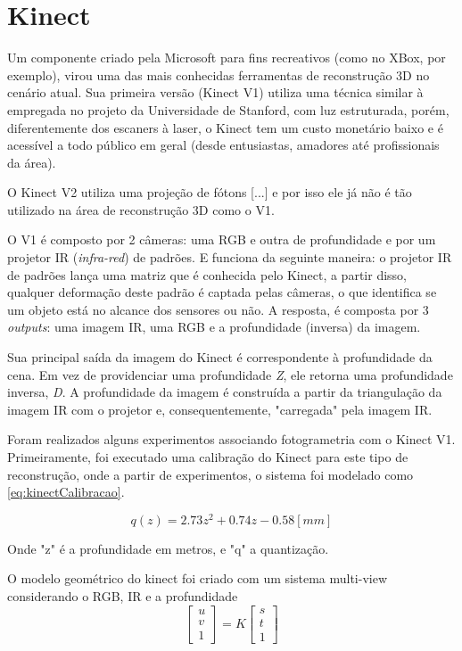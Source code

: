 \chapter{Kinect}\label{sec:kinect}
Um componente criado pela Microsoft para fins recreativos (como no XBox, por exemplo), virou uma das mais conhecidas ferramentas de reconstrução 3D no cenário atual. Sua primeira versão (Kinect V1) utiliza uma técnica similar à empregada no projeto da Universidade de Stanford, com luz estruturada, porém, diferentemente dos escaners à laser, o Kinect tem um custo monetário baixo e é acessível a todo público em geral (desde entusiastas, amadores até profissionais da área). 

O Kinect V2 utiliza uma projeção de fótons [...] e por isso ele já não é tão utilizado na área de reconstrução 3D como o V1. 

O V1 é composto por 2 câmeras: uma RGB e outra de profundidade e por um projetor IR ({\it infra-red}) de padrões. E funciona da seguinte maneira: o projetor IR de padrões lança uma matriz que é conhecida pelo Kinect, a partir disso, qualquer deformação deste padrão é captada pelas câmeras, o que identifica se um objeto está no alcance dos sensores ou não. A resposta, é composta por 3 {\it outputs}: uma imagem IR,  uma RGB e a profundidade (inversa) da imagem.


Sua principal saída da imagem do Kinect é correspondente à profundidade da cena. Em vez de providenciar uma profundidade {\it Z}, ele retorna uma profundidade inversa, {\it D}.
A profundidade da imagem é construída a partir da triangulação da imagem IR com o projetor e, consequentemente, "carregada" pela imagem IR.

 
Foram realizados alguns experimentos associando fotogrametria com o Kinect V1. Primeiramente, foi executado uma calibração do Kinect para este tipo de reconstrução, onde a partir de experimentos, o sistema foi modelado como \ref{eq:kinectCalibracao}.

\begin{equation}
q(z) = 2.73 z^2 + 0.74 z − 0.58 [mm]
\label{eq:kinectCalibracao}
\end{equation}

Onde "z" é a profundidade em metros, e "q" a quantização.

O modelo geométrico do kinect foi criado com um sistema multi-view considerando o RGB, IR e a profundidade
\begin{equation}
\begin{bmatrix}u \\v \\ 1 \end{bmatrix} = K \begin{bmatrix}s \\t \\ 1 \end{bmatrix}
\end{equation}

